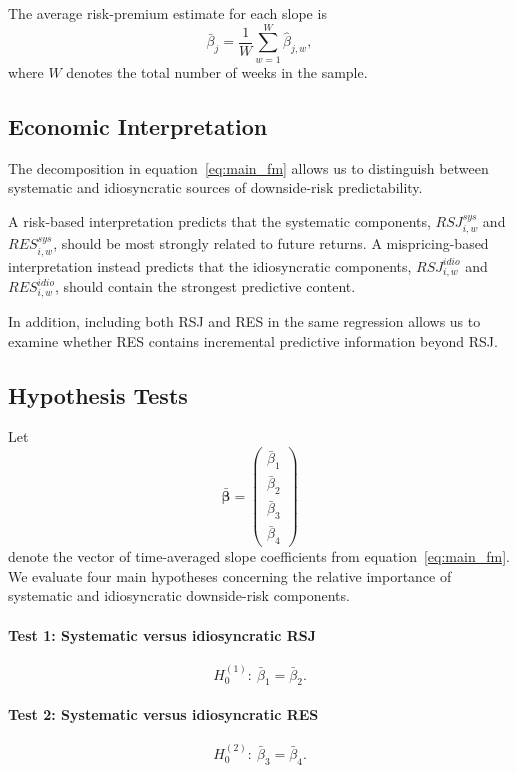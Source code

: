 \documentclass[11pt,a4paper]{article}
\begin{document}
The average risk-premium estimate for each slope is
\begin{equation}
\bar{\beta}_j = \frac{1}{W}\sum_{w=1}^{W} \hat{\beta}_{j,w},
\label{eq:fm_avg}
\end{equation}
where $W$ denotes the total number of weeks in the sample.

\subsection{Economic Interpretation}

The decomposition in equation~\eqref{eq:main_fm} allows us to distinguish between
systematic and idiosyncratic sources of downside-risk predictability.

A risk-based interpretation predicts that the systematic components,
$RSJ^{sys}_{i,w}$ and $RES^{sys}_{i,w}$, should be most strongly related to future returns.
A mispricing-based interpretation instead predicts that the idiosyncratic components,
$RSJ^{idio}_{i,w}$ and $RES^{idio}_{i,w}$, should contain the strongest predictive content.

In addition, including both RSJ and RES in the same regression allows us to examine whether
RES contains incremental predictive information beyond RSJ.

\subsection{Hypothesis Tests}

Let
\[
\bar{\bm{\beta}}
=
\begin{pmatrix}
\bar{\beta}_1\\
\bar{\beta}_2\\
\bar{\beta}_3\\
\bar{\beta}_4
\end{pmatrix}
\]
denote the vector of time-averaged slope coefficients from equation~\eqref{eq:main_fm}.
We evaluate four main hypotheses concerning the
relative importance of systematic and idiosyncratic downside-risk
components.

\paragraph{Test 1: Systematic versus idiosyncratic RSJ}
\begin{equation}
H_0^{(1)}:\ \bar{\beta}_1 = \bar{\beta}_2.
\label{eq:H1}
\end{equation}

\paragraph{Test 2: Systematic versus idiosyncratic RES}
\begin{equation}
H_0^{(2)}:\ \bar{\beta}_3 = \bar{\beta}_4.
\label{eq:H2}
\end{equation}
\end{document}
